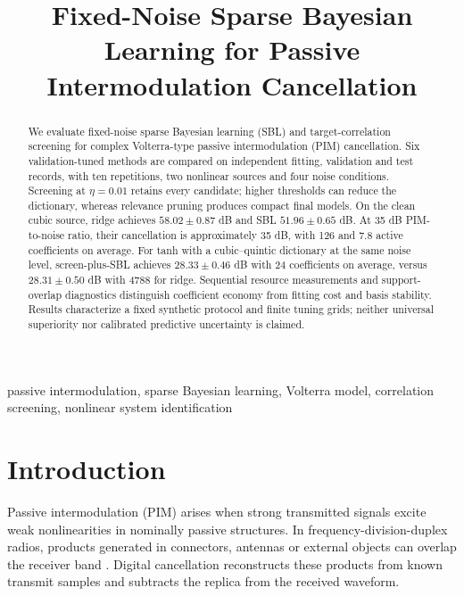 \documentclass[conference]{IEEEtran}
\begin{document}

\title{Fixed-Noise Sparse Bayesian Learning for Passive Intermodulation Cancellation}

\author{}

\maketitle

\begin{abstract}
We evaluate fixed-noise sparse Bayesian learning (SBL) and target-correlation screening for complex Volterra-type passive intermodulation (PIM) cancellation. Six validation-tuned methods are compared on independent fitting, validation and test records, with ten repetitions, two nonlinear sources and four noise conditions. Screening at $\eta=0.01$ retains every candidate; higher thresholds can reduce the dictionary, whereas relevance pruning produces compact final models. On the clean cubic source, ridge achieves $58.02\pm0.87$ dB and SBL $51.96\pm0.65$ dB. At 35 dB PIM-to-noise ratio, their cancellation is approximately 35 dB, with 126 and 7.8 active coefficients on average. For tanh with a cubic--quintic dictionary at the same noise level, screen-plus-SBL achieves $28.33\pm0.46$ dB with 24 coefficients on average, versus $28.31\pm0.50$ dB with 4788 for ridge. Sequential resource measurements and support-overlap diagnostics distinguish coefficient economy from fitting cost and basis stability. Results characterize a fixed synthetic protocol and finite tuning grids; neither universal superiority nor calibrated predictive uncertainty is claimed.
\end{abstract}
\begin{IEEEkeywords}
passive intermodulation, sparse Bayesian learning, Volterra model, correlation screening, nonlinear system identification
\end{IEEEkeywords}

\section{Introduction}\label{sec:intro}
Passive intermodulation (PIM) arises when strong transmitted signals excite weak nonlinearities in nominally passive structures. In frequency-division-duplex radios, products generated in connectors, antennas or external objects can overlap the receiver band \cite{Lui1990PIM,Lampu2021AirInduced,Lampu2023Algorithms,Ahmmed2023Overview}. Digital cancellation reconstructs these products from known transmit samples and subtracts the replica from the received waveform.
\end{document}
